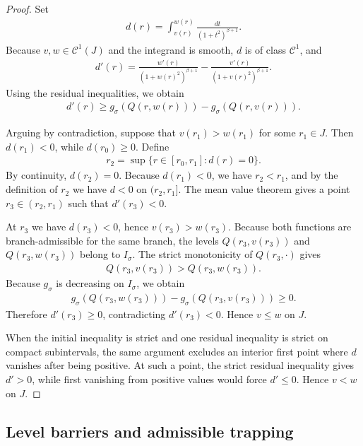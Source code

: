 \documentclass{amsart}
\theoremstyle{plain}
\theoremstyle{mainintrothm}
\theoremstyle{definition}
\begin{document}
	\begin{proof}
		Set
		\begin{align*}
			d(r)
			=
			\int_{v(r)}^{w(r)}
			\frac{dt}{(1+t^2)^{\beta+1}}.
		\end{align*}
		Because $v,w\in\mathcal C^1(J)$ and the integrand is smooth, $d$ is of class
		$\mathcal C^1$, and
		\begin{align*}
			d'(r)
			=
			\frac{w'(r)}{(1+w(r)^2)^{\beta+1}}
			-
			\frac{v'(r)}{(1+v(r)^2)^{\beta+1}}.
		\end{align*}
		Using the residual inequalities, we obtain
		\begin{align*}
			d'(r)
			\geq
			g_\sigma(Q(r,w(r)))
			-
			g_\sigma(Q(r,v(r))).
		\end{align*}
		
		Arguing by contradiction, suppose that $v(r_1)>w(r_1)$ for some
		$r_1\in J$.  Then $d(r_1)<0$, while $d(r_0)\geq0$.  Define
		\begin{align*}
			r_2
			=
			\sup\{r\in[r_0,r_1]:d(r)=0\}.
		\end{align*}
		By continuity, $d(r_2)=0$.  Because $d(r_1)<0$, we have $r_2<r_1$, and by
		the definition of $r_2$ we have $d<0$ on $(r_2,r_1]$.  The mean value
		theorem gives a point $r_3\in(r_2,r_1)$ such that $d'(r_3)<0$.
		\medskip
		
		At $r_3$ we have $d(r_3)<0$, hence $v(r_3)>w(r_3)$.  Because both functions
		are branch-admissible for the same branch, the levels
		$Q(r_3,v(r_3))$ and $Q(r_3,w(r_3))$ belong to $I_\sigma$.  The strict
		monotonicity of $Q(r_3,\cdot)$ gives
		\begin{align*}
			Q(r_3,v(r_3))
			>
			Q(r_3,w(r_3)).
		\end{align*}
		Because $g_\sigma$ is decreasing on $I_\sigma$, we obtain
		\begin{align*}
			g_\sigma(Q(r_3,w(r_3)))
			-
			g_\sigma(Q(r_3,v(r_3)))
			\geq0.
		\end{align*}
		Therefore $d'(r_3)\geq0$, contradicting $d'(r_3)<0$.  Hence $v\leq w$ on
		$J$.
		\medskip
		
		When the initial inequality is strict and one residual inequality is strict on
		compact subintervals, the same argument excludes an interior first point
		where $d$ vanishes after being positive.  At such a point, the strict
		residual inequality gives $d'>0$, while first vanishing from positive values
		would force $d'\leq0$.  Hence $v<w$ on $J$.
	\end{proof}	
	
\subsection{Level barriers and admissible trapping}\,
\label{subsec:level-barriers}
\end{document}
